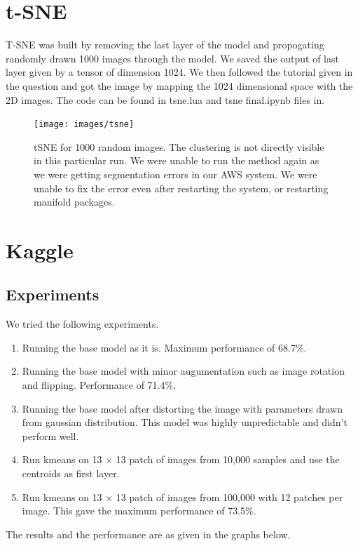 \documentclass{article}
\begin{document}
\section{t-SNE}
T-SNE was built by removing the last layer of the model and propogating randomly drawn 1000 images through the model.  We saved the output of last layer given by a tensor of dimension 1024.  We then followed the tutorial given in the question and got the image by mapping the 1024 dimensional space with the 2D images. The code can be found in tsne.lua and tsne final.ipynb files in\cite{code}.
\begin{figure}[ht!]
  \centering
  \texttt{[image: images/tsne]}
  \caption{tSNE for 1000 random images.  The clustering is not directly visible in this particular run.  We were unable to run the method again as we were getting segmentation errors in our AWS system.  We were unable to fix the error even after restarting the system, or restarting manifold packages.}
\end{figure}


\section{Kaggle}

\subsection{Experiments}
We tried the following experiments.
\begin{enumerate}
\item Running the base model as it is.  Maximum performance of 68.7\%.
\item Running the base model with minor augumentation such as image rotation and flipping.  Performance of 71.4\%.
\item Running the base model after distorting the image with parameters drawn from gaussian distribution.  This model was highly unpredictable and didn't perform well. 
\item Run kmeans on 13 $\times{}$ 13 patch of images from 10,000 samples and use the centroids as first layer.
\item Run kmeans on 13 $\times{}$ 13 patch of images from 100,000 with 12 patches per image. This gave the maximum performance of 73.5\%.
\end{enumerate}

The results and the performance are as given in the graphs below.
\end{document}
